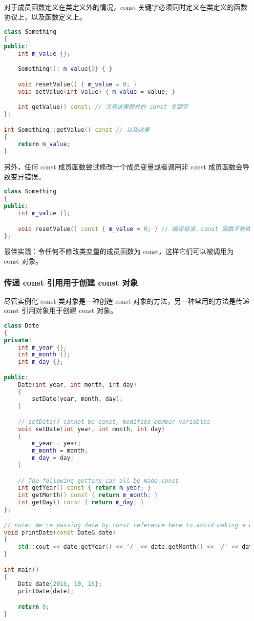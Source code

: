 \documentclass[../../LearnCpp.tex]{subfiles}
\begin{document}
对于成员函数定义在类定义外的情况，const 关键字必须同时定义在类定义的函数协议上，以及函数定义上。

\begin{lstlisting}[language=C++]
class Something
{
public:
    int m_value {};

    Something(): m_value{0} { }

    void resetValue() { m_value = 0; }
    void setValue(int value) { m_value = value; }

    int getValue() const; // 注意这里额外的 const 关键字
};

int Something::getValue() const // 以及这里
{
    return m_value;
}
\end{lstlisting}

另外，任何 const 成员函数尝试修改一个成员变量或者调用非 const 成员函数会导致变异错误。

\begin{lstlisting}[language=C++]
class Something
{
public:
    int m_value {};

    void resetValue() const { m_value = 0; } // 编译错误，const 函数不能修改成员变量
};
\end{lstlisting}

最佳实践：令任何不修改类变量的成员函数为 const，这样它们可以被调用为 const 对象。

\subsubsection*{传递 const 引用用于创建 const 对象}

尽管实例化 const 类对象是一种创造 const 对象的方法，另一种常用的方法是传递 const 引用对象用于创建 const 对象。

\begin{lstlisting}[language=C++]
class Date
{
private:
    int m_year {};
    int m_month {};
    int m_day {};

public:
    Date(int year, int month, int day)
    {
        setDate(year, month, day);
    }

    // setDate() cannot be const, modifies member variables
    void setDate(int year, int month, int day)
    {
        m_year = year;
        m_month = month;
        m_day = day;
    }

    // The following getters can all be made const
    int getYear() const { return m_year; }
    int getMonth() const { return m_month; }
    int getDay() const { return m_day; }
};

// note: We're passing date by const reference here to avoid making a copy of date
void printDate(const Date& date)
{
    std::cout << date.getYear() << '/' << date.getMonth() << '/' << date.getDay() << '\n';
}

int main()
{
    Date date{2016, 10, 16};
    printDate(date);

    return 0;
}
\end{lstlisting}
\end{document}
